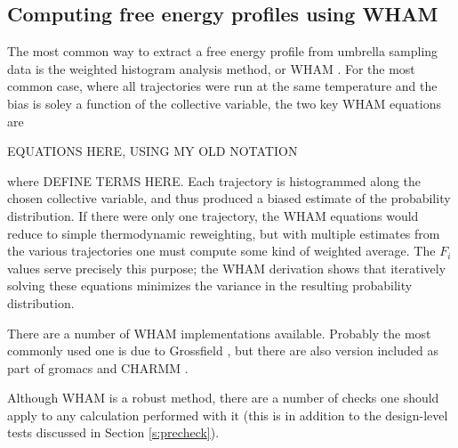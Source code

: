 
\subsection{Computing free energy profiles using WHAM}

The most common way to extract a free energy profile from umbrella sampling data
is the weighted histogram analysis method, or WHAM \cite{2 kumar papers, Roux
paper from 95, something recent}.  For the most common case, where all
trajectories were run at the same temperature and the bias is soley a function
of the collective variable, the two key WHAM equations are

EQUATIONS HERE, USING MY OLD NOTATION

where DEFINE TERMS HERE. Each trajectory is histogrammed along the chosen
collective variable, and thus produced a biased estimate of the probability
distribution. If there were only one trajectory, the WHAM equations would reduce
to simple thermodynamic reweighting, but with multiple estimates from the
various trajectories one must compute some kind of weighted average.  The  $F_i$
values serve precisely this purpose; the WHAM derivation shows that iteratively
solving these equations minimizes the variance in the resulting probability
distribution.

There are a number of WHAM implementations available.  Probably the most commonly used one is due to Grossfield \cite{WHAM}, but there are also version included as part of gromacs \cite{} and CHARMM \cite{}.

Although WHAM is a robust method, there are a number of checks one should apply
to any calculation performed with it (this is in addition to the design-level
tests discussed in Section \ref{s:precheck}).

